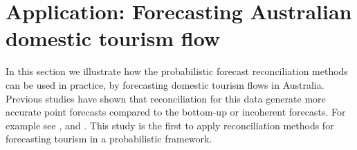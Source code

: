 \documentclass[12pt]{article}
\theoremstyle{definition}
\begin{document}

%
%
%


\section{Application: Forecasting Australian domestic tourism flow}\label{sec:Application}

In this section we illustrate how the probabilistic forecast reconciliation methods can be used in practice, by forecasting domestic tourism flows in Australia. Previous studies have shown that reconciliation for this data generate more accurate point forecasts compared to the bottom-up or incoherent forecasts. For example see \citet{AthEtAl2009}, \citet{HynEtAl2011} and \citet{WicEtAl2019}. This study is the first to apply reconciliation methods for forecasting tourism in a probabilistic framework.
\end{document}
